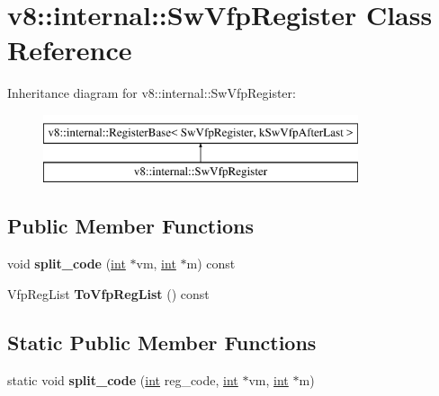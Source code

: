 \hypertarget{classv8_1_1internal_1_1SwVfpRegister}{}\section{v8\+:\+:internal\+:\+:Sw\+Vfp\+Register Class Reference}
\label{classv8_1_1internal_1_1SwVfpRegister}
Inheritance diagram for v8\+:\+:internal\+:\+:Sw\+Vfp\+Register\+:\begin{figure}[H]
\begin{center}
\leavevmode
\includegraphics[height=2.000000cm]{classv8_1_1internal_1_1SwVfpRegister}
\end{center}
\end{figure}
\subsection*{Public Member Functions}
\begin{DoxyCompactItemize}
\item 
\mbox{\label{classv8_1_1internal_1_1SwVfpRegister_ab50a6e215f427a2d706a5b83cad92fea}} 
void {\bfseries split\+\_\+code} (\mbox{\hyperlink{classint}{int}} $\ast$vm, \mbox{\hyperlink{classint}{int}} $\ast$m) const
\item 
\mbox{\label{classv8_1_1internal_1_1SwVfpRegister_ad797e75c1fb1793661808f3fd3c28c18}} 
Vfp\+Reg\+List {\bfseries To\+Vfp\+Reg\+List} () const
\end{DoxyCompactItemize}
\subsection*{Static Public Member Functions}
\begin{DoxyCompactItemize}
\item 
\mbox{\label{classv8_1_1internal_1_1SwVfpRegister_a5b0d8d86064c2caf77c28dbb8e85fe42}} 
static void {\bfseries split\+\_\+code} (\mbox{\hyperlink{classint}{int}} reg\+\_\+code, \mbox{\hyperlink{classint}{int}} $\ast$vm, \mbox{\hyperlink{classint}{int}} $\ast$m)
\end{DoxyCompactItemize}
